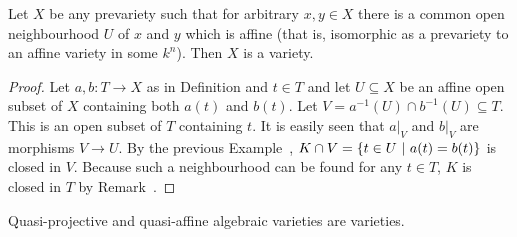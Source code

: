 \documentclass[a4paper,parskip=half,numbers=enddot, DIV=12]{scrreprt}
\begin{document}
\begin{prop}
    Let $X$ be any prevariety such that for arbitrary $x,y\in X$ there is a common open neighbourhood $U$ of $x$ and $y$ which is affine (that is, isomorphic as a prevariety to an affine variety in some $k^n$). Then $X$ is a variety.
\end{prop}
\begin{proof}
    Let $a,b\colon T\to X$ as in Definition  and $t\in T$ and let $U\subseteq X$ be an affine open subset of $X$ containing both $a(t)$ and $b(t)$. Let $V = a^{-1}(U) \cap b^{-1}(U)\subseteq T$. This is an open subset of $T$ containing $t$. It is easily seen that $a|_V$ and $b|_V$ are morphisms $V\to U$. By the previous Example~, $K\cap V = \left\{t\in U\ \middle|\  a(t) = b(t)\right\}$ is closed in $V$. Because such a neighbourhood can be found for any $t\in T$, $K$ is closed in $T$ by Remark~.
\end{proof}
\begin{cor}
    Quasi-projective and quasi-affine algebraic varieties are varieties.
\end{cor}
\end{document}
